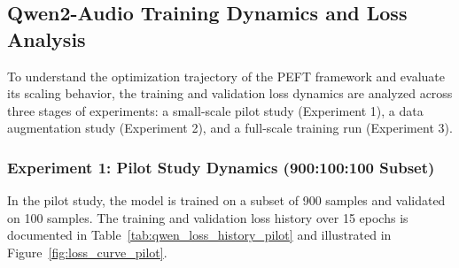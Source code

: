 \documentclass[12pt, conference, letterpaper]{IEEEtran}
\begin{document}
\subsection{Qwen2-Audio Training Dynamics and Loss Analysis}
To understand the optimization trajectory of the PEFT framework and evaluate its scaling behavior, the training and validation loss dynamics are analyzed across three stages of experiments: a small-scale pilot study (Experiment 1), a data augmentation study (Experiment 2), and a full-scale training run (Experiment 3).

\subsubsection{Experiment 1: Pilot Study Dynamics (900:100:100 Subset)}
In the pilot study, the model is trained on a subset of 900 samples and validated on 100 samples. The training and validation loss history over 15 epochs is documented in Table~\ref{tab:qwen_loss_history_pilot} and illustrated in Figure~\ref{fig:loss_curve_pilot}.
\end{document}
